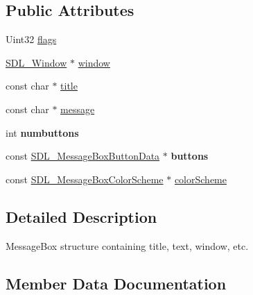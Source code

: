 \subsection*{Public Attributes}
\begin{DoxyCompactItemize}
\item 
Uint32 \hyperlink{structSDL__MessageBoxData_a113d016f760bf4e4156b0f376358d6a0}{flags}
\item 
\hyperlink{SDL__video_8h_a55a196c7d3b8497538632c79ae1e6392}{S\+D\+L\+\_\+\+Window} $\ast$ \hyperlink{structSDL__MessageBoxData_a5c333bc93705c66068e140bc28daedcb}{window}
\item 
const char $\ast$ \hyperlink{structSDL__MessageBoxData_a93ceeafeed20b553ad4c86c9be37f117}{title}
\item 
const char $\ast$ \hyperlink{structSDL__MessageBoxData_ada6ae208a1f85adabbd7a7a08ca609c8}{message}
\item 
\mbox{\label{structSDL__MessageBoxData_a133f4fef549cc0cb14b799af35f3dc5a}} 
int {\bfseries numbuttons}
\item 
\mbox{\label{structSDL__MessageBoxData_a265e47aab749e384661ae91d3e11e0db}} 
const \hyperlink{structSDL__MessageBoxButtonData}{S\+D\+L\+\_\+\+Message\+Box\+Button\+Data} $\ast$ {\bfseries buttons}
\item 
const \hyperlink{structSDL__MessageBoxColorScheme}{S\+D\+L\+\_\+\+Message\+Box\+Color\+Scheme} $\ast$ \hyperlink{structSDL__MessageBoxData_a18744865a3e89e260db5f01aee579e35}{color\+Scheme}
\end{DoxyCompactItemize}


\subsection{Detailed Description}
Message\+Box structure containing title, text, window, etc. 

\subsection{Member Data Documentation}
\mbox{\label{structSDL__MessageBoxData_a18744865a3e89e260db5f01aee579e35}} 
